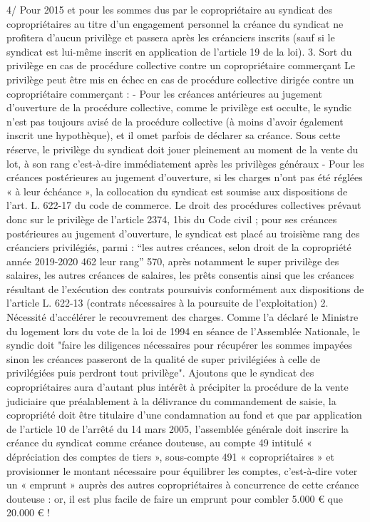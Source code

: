 4\degres/ Pour 2015 et pour les sommes dus par le copropriétaire au syndicat des copropriétaires au titre d’un engagement personnel la créance du syndicat ne profitera d'aucun privilège et passera après les créanciers inscrits (sauf si le syndicat est lui-même inscrit en application de l’article 19 de la loi).
3. Sort du privilège en cas de procédure collective contre un copropriétaire commerçant
Le privilège peut être mis en échec en cas de procédure collective dirigée contre un copropriétaire commerçant :
- Pour les créances antérieures au jugement d’ouverture de la procédure collective, comme le privilège est occulte, le syndic n’est pas toujours avisé de la procédure collective (à moins d’avoir également inscrit une hypothèque), et il omet parfois de déclarer sa créance. Sous cette réserve, le privilège du syndicat doit jouer pleinement au moment de la vente du lot, à son rang c'est-à-dire immédiatement après les privilèges généraux
- Pour les créances postérieures au jugement d’ouverture, si les charges n’ont pas été réglées « à leur échéance », la collocation du syndicat est soumise aux dispositions de l’art. L. 622-17 du code de commerce. Le droit des procédures collectives prévaut donc sur le privilège de l'article 2374, 1\degres bis du Code civil ; pour ses créances postérieures au jugement d'ouverture, le syndicat est placé au troisième rang des créanciers privilégiés, parmi : “les autres créances, selon
droit de la copropriété année 2019-2020
462
leur rang” 570, après notamment le super privilège des salaires, les autres créances de salaires, les prêts consentis ainsi que les créances résultant de l'exécution des contrats poursuivis conformément aux dispositions de l'article L. 622-13 (contrats nécessaires à la poursuite de l’exploitation)
2. Nécessité d’accélérer le recouvrement des charges.
Comme l’a déclaré le Ministre du logement lors du vote de la loi de 1994 en séance de l'Assemblée Nationale, le syndic doit "faire les diligences nécessaires pour récupérer les sommes impayées sinon les créances passeront de la qualité de super privilégiées à celle de privilégiées puis perdront tout privilège".
Ajoutons que le syndicat des copropriétaires aura d’autant plus intérêt à précipiter la procédure de la vente judiciaire que préalablement à la délivrance du commandement de saisie, la copropriété doit être titulaire d’une condamnation au fond et que par application de l’article 10 de l’arrêté du 14 mars 2005, l'assemblée générale doit inscrire la créance du syndicat comme créance douteuse, au compte 49 intitulé « dépréciation des comptes de tiers », sous-compte 491 « copropriétaires » et provisionner le montant nécessaire pour équilibrer les comptes, c'est-à-dire voter un « emprunt » auprès des autres copropriétaires à concurrence de cette créance douteuse : or, il est plus facile de faire un emprunt pour combler 5.000 € que 20.000 € !
